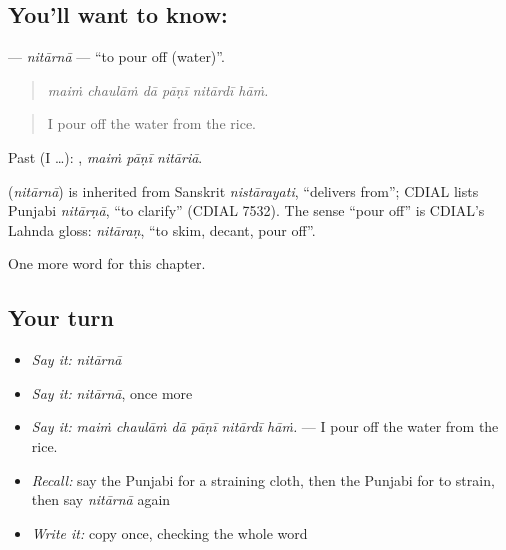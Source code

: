 \subsection*{You'll want to know: }
\textbf{} — \emph{nitārnā} — \textquotedblleft{}to pour off (water)\textquotedblright{}.

\begin{quote}
     
\end{quote}

\begin{quote}
\emph{maiṁ chaulāṁ dā pāṇī nitārdī hāṁ.}
\end{quote}

\begin{quote}
I pour off the water from the rice.
\end{quote}

Past (I …):   , \emph{maiṁ pāṇī nitāriā}.

\begin{cousinweb}
\textbf{} (\emph{nitārnā}) is inherited from Sanskrit \emph{nistārayati}, \textquotedblleft{}delivers from\textquotedblright{}; CDIAL lists Punjabi \emph{nitārṇā}, \textquotedblleft{}to clarify\textquotedblright{} (CDIAL 7532). The sense \textquotedblleft{}pour off\textquotedblright{} is CDIAL's Lahnda gloss: \emph{nitāraṇ}, \textquotedblleft{}to skim, decant, pour off\textquotedblright{}.
\end{cousinweb}

\begin{grammarlens}[title={What you've built}]
One more word for this chapter.
\end{grammarlens}

\subsection*{Your turn}
\begin{itemize}
\raggedright
  \item \emph{Say it:} \emph{nitārnā}
  \item \emph{Say it:} \emph{nitārnā}, once more
  \item \emph{Say it:} \emph{maiṁ chaulāṁ dā pāṇī nitārdī hāṁ.} — I pour off the water from the rice.
  \item \emph{Recall:} say the Punjabi for a straining cloth, then the Punjabi for to strain, then say \emph{nitārnā} again
  \item \emph{Write it:} copy \textbf{} once, checking the whole word
\end{itemize}

